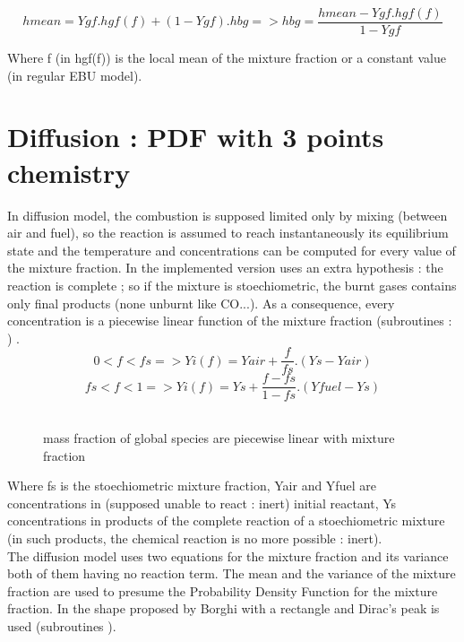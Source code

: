 \begin{equation}
hmean = Ygf.hgf(f) + (1-Ygf).hbg => hbg
= \frac{hmean-Ygf.hgf(f)}{1-Ygf}
\end{equation}

Where f ({\small in hgf(f)}) is the local mean of the mixture fraction
or a constant value ({\small in regular EBU model}).

\section{Diffusion : PDF with 3 points chemistry}

In diffusion model, the combustion is supposed limited only by mixing
({\small between air and fuel}), so the reaction is assumed to reach
instantaneously its equilibrium state and the temperature and
concentrations can be computed for every value of the mixture
fraction. In \CS the implemented version uses an extra hypothesis :
the reaction is complete ; so if the mixture is stoechiometric, the
burnt gases contains only final products ({\small none unburnt like
CO...}). As a consequence, every concentration is a piecewise linear
function of the mixture fraction (subroutines : ) .\\
\begin{equation}
0<f<fs => Yi(f) = Yair + \frac{f}{fs} . (Ys-Yair)
\end{equation}
\begin{equation}
fs<f<1 => Yi(f) = Ys + \frac{f-fs}{1-fs} . (Yfuel-Ys)
\end{equation}\\
\begin{figure}[h]
\caption{mass fraction of global species are piecewise linear with mixture fraction}
\end{figure}
Where fs is the stoechiometric mixture fraction, Yair and Yfuel are
concentrations in ({\small supposed unable to react : inert}) initial
reactant, Ys concentrations in products of the complete reaction of a
stoechiometric mixture ({\small in such products, the chemical
reaction is no more possible : inert}).\\

The diffusion model uses two equations for the mixture fraction and
its variance both of them having no reaction term. The mean and the
variance of the mixture fraction are used to presume the Probability
Density Function for the mixture fraction. In \CS the shape proposed
by Borghi \cite{4} with a rectangle and Dirac's peak is used
(subroutines ).\\

